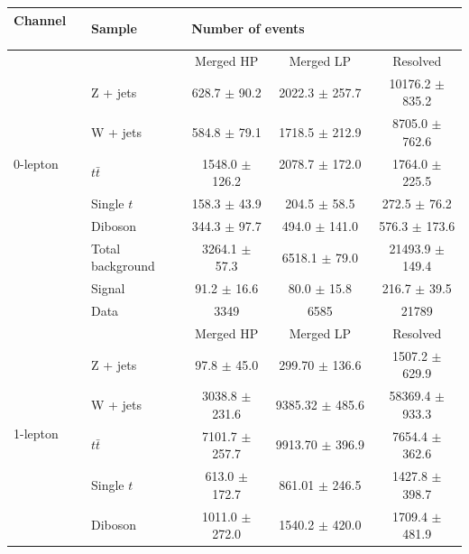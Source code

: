 \begin{table}[htbp]
\begin{center}
\begin{tabular}{| l | l | c | c | c |} \hline
Channel          　& Sample        & \multicolumn{3}{|l|}{Number of events} \\ \hline \hline
\multirow{7}{*}{0-lepton} &               & Merged HP  & Merged LP  & Resolved  \\ \cline{2-5}
                   & Z + jets     & 628.7 $\pm$ 90.2           & 2022.3 $\pm$ 257.7           & 10176.2 $\pm$ 835.2\\ 
                   & W + jets     & 584.8 $\pm$ 79.1          & 1718.5 $\pm$ 212.9           & 8705.0 $\pm$ 762.6\\  
                   & $t\bar{t}$   & 1548.0 $\pm$ 126.2        &  2078.7 $\pm$ 172.0       　　& 1764.0 $\pm$ 225.5\\ 
                   & Single $t$   & 158.3 $\pm$ 43.9          &  204.5 $\pm$ 58.5         　  & 272.5 $\pm$ 76.2  \\ 
                   & Diboson      &  344.3 $\pm$ 97.7         &  494.0 $\pm$ 141.0            & 576.3 $\pm$ 173.6\\ \cline{2-5}
                   & Total background    & 3264.1 $\pm$ 57.3  &  6518.1 $\pm$ 79.0            &21493.9 $\pm$ 149.4\\ \cline{2-5}
                   & Signal       & 91.2 $\pm$ 16.6           &   80.0 $\pm$ 15.8             & 216.7 $\pm$ 39.5\\ \cline{2-5}
                   & Data         & 3349           & 6585           &21789\\ \hline \hline
\multirow{7}{*}{1-lepton} &               & Merged HP  & Merged LP  & Resolved  \\ \cline{2-5}
                   & Z + jets     & 97.8 $\pm$ 45.0           & 299.70 $\pm$ 136.6           &1507.2 $\pm$ 629.9\\ 
                   & W + jets     & 3038.8 $\pm$ 231.6           &  9385.32 $\pm$ 485.6          &58369.4 $\pm$ 933.3\\  
                   & $t\bar{t}$   & 7101.7 $\pm$ 257.7           &  9913.70 $\pm$ 396.9          &7654.4 $\pm$ 362.6\\ 
                   & Single $t$   & 613.0 $\pm$ 172.7           &  861.01 $\pm$ 246.5          & 1427.8 $\pm$ 398.7\\ 
                   & Diboson      & 1011.0 $\pm$ 272.0          &   1540.2 $\pm$ 420.0         & 1709.4 $\pm$ 481.9\\ \cline{2-5}

\end{tabular}
\end{center}
\end{table}

